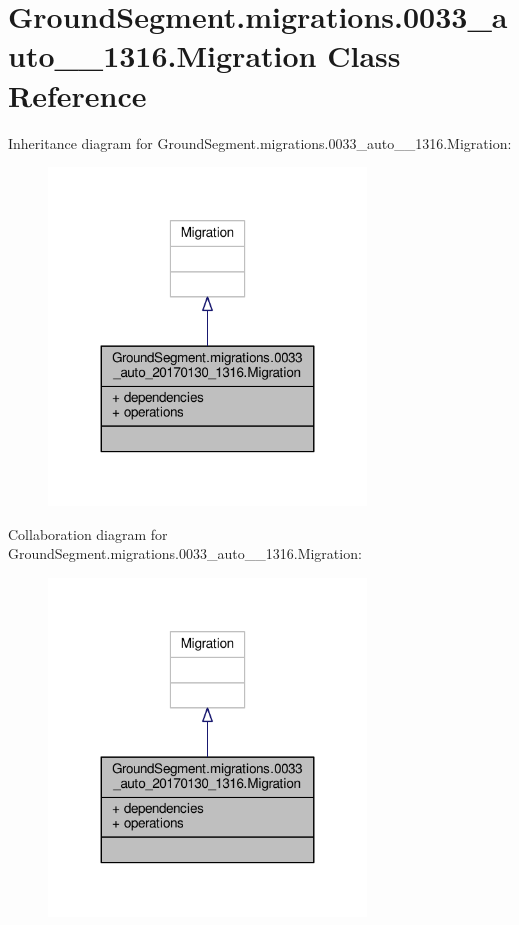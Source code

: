 \hypertarget{class_ground_segment_1_1migrations_1_10033__auto__20170130__1316_1_1_migration}{}\section{Ground\+Segment.\+migrations.0033\+\_\+auto\+\_\+\_\+1316.Migration Class Reference}
\label{class_ground_segment_1_1migrations_1_10033__auto__20170130__1316_1_1_migration}


Inheritance diagram for Ground\+Segment.\+migrations.0033\+\_\+auto\+\_\+\_\+1316.Migration\+:\nopagebreak
\begin{figure}[H]
\begin{center}
\leavevmode
\includegraphics[width=239pt]{class_ground_segment_1_1migrations_1_10033__auto__20170130__1316_1_1_migration__inherit__graph}
\end{center}
\end{figure}


Collaboration diagram for Ground\+Segment.\+migrations.0033\+\_\+auto\+\_\+\_\+1316.Migration\+:\nopagebreak
\begin{figure}[H]
\begin{center}
\leavevmode
\includegraphics[width=239pt]{class_ground_segment_1_1migrations_1_10033__auto__20170130__1316_1_1_migration__coll__graph}
\end{center}
\end{figure}
